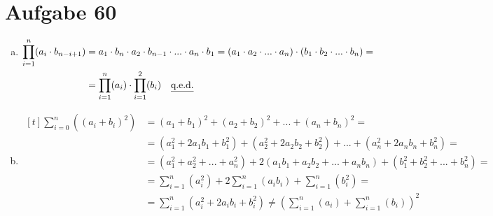 \section{Aufgabe 60}
\begin{enumerate}[(a)]
    \item $\begin{aligned}[t]
            \prod_{i = 1}^{n} (a_i \cdot b_{n - i + 1}) &= a_1 \cdot b_{n} \cdot a_2 \cdot b_{n - 1} \cdot ... \cdot a_{n} \cdot b_{1} = (a_1 \cdot a_2 \cdot ... \cdot a_n) \cdot (b_1 \cdot b_2 \cdot ... \cdot b_n) = \\
                                                        &= \prod_{i = 1}^n(a_i) \cdot \prod_{i = 1}^2(b_i) \quad \text{\underline{q.e.d.}}
        \end{aligned}$
    \item $\begin{aligned}[t]
            \sum_{i = 0}^n((a_i + b_i)^2) &= (a_1 + b_1)^2 + (a_2 + b_2)^2 + ... + (a_n + b_n)^2 = \\
                                          &= (a_1^2 + 2a_1b_1 + b_1^2) + (a_2^2 + 2a_2b_2 + b_2^2) + ... + (a_n^2 + 2a_nb_n + b_n^2) = \\[5pt]
                                          &= (a_1^2 + a_2^2 + ... + a_n^2) + 2(a_1b_1 + a_2b_2 + ... + a_nb_n) + (b_1^2 + b_2^2 + ... + b_n^2) = \\[5pt]
                                          &= \sum_{i = 1}^n(a_i^2) + 2\sum_{i = 1}^n(a_ib_i) + \sum_{i = 1}^n(b_i^2) = \\[5pt]
                                          &= \sum_{i = 1}^n(a_i^2 + 2a_ib_i + b_i^2) \neq (\sum_{i = 1}^n(a_i) + \sum_{i = 1}^n(b_i))^2
        \end{aligned}$
\end{enumerate}
